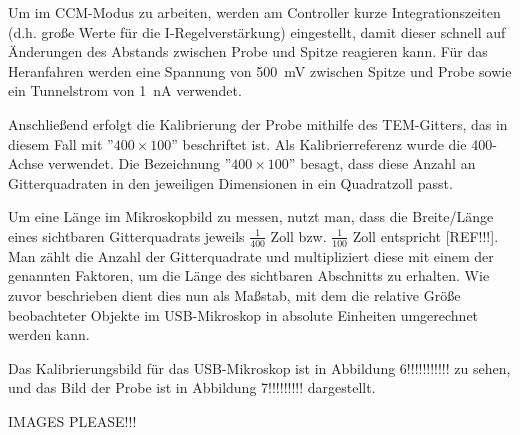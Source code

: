 Um im CCM-Modus zu arbeiten, werden am Controller kurze Integrationszeiten (d.h. große Werte für die I-Regelverstärkung) eingestellt, damit dieser schnell auf Änderungen des Abstands zwischen Probe und Spitze reagieren kann. Für das Heranfahren werden eine Spannung von \SI{500}{\mV} zwischen Spitze und Probe sowie ein Tunnelstrom von \SI{1}{\nA} verwendet.

Anschließend erfolgt die Kalibrierung der Probe mithilfe des TEM-Gitters, das in diesem Fall mit ''$400 \times 100$'' beschriftet ist. Als Kalibrierreferenz wurde die 400-Achse verwendet. Die Bezeichnung ''$400 \times 100$'' besagt, dass diese Anzahl an Gitterquadraten in den jeweiligen Dimensionen in ein Quadratzoll passt.

Um eine Länge im Mikroskopbild zu messen, nutzt man, dass die Breite/Länge eines sichtbaren Gitterquadrats jeweils $\frac{1}{400}$ Zoll bzw. $\frac{1}{100}$ Zoll entspricht [REF!!!]. Man zählt die Anzahl der Gitterquadrate und multipliziert diese mit einem der genannten Faktoren, um die Länge des sichtbaren Abschnitts zu erhalten. Wie zuvor beschrieben dient dies nun als Maßstab, mit dem die relative Größe beobachteter Objekte im USB-Mikroskop in absolute Einheiten umgerechnet werden kann.

Das Kalibrierungsbild für das USB-Mikroskop ist in Abbildung 6!!!!!!!!!!! zu sehen, und das Bild der Probe ist in Abbildung 7!!!!!!!!! dargestellt.

IMAGES PLEASE!!!


